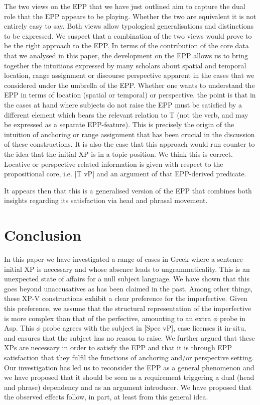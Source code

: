 \documentclass[11pt]{article}
\begin{document}
The two views on the EPP that we have just outlined aim to capture the dual role that the EPP appears to be playing.  Whether the two are equivalent it is not entirely easy to say.  Both views allow typological generalisations and distinctions to be expressed.  We suspect that a combination of the two views would prove to be the right approach to the EPP.  In terms of the contribution of the core data that we analysed in this paper, the development on the EPP allows us to bring together the intuitions expressed by many scholars about spatial and temporal location, range assignment or discourse perspective apparent in the cases that we considered under the umbrella of the EPP.  Whether one wants to understand the EPP in terms of location (spatial or temporal) or perspective, the point is that in the cases at hand where subjects do not raise the EPP must be satisfied by a different element which bears the relevant relation to T (not the verb, and may be expressed as a separate EPP-feature).  This is precisely the origin of the intuition of anchoring or range assignment that has been crucial in the discussion of these constructions. It is also the case that this approach would run counter to the idea that the initial XP is in a topic position.  We think this is correct.  Locative or perspective related information is given with respect to the propositional core, i.e. [T vP] and an argument of that EPP-derived predicate.

It appears then that this is a generalised version of the EPP that combines both insights regarding its satisfaction via head and phrasal movement.


 
 \section{Conclusion} \label{concl}
In this paper we have investigated a range of cases in Greek where a sentence initial XP is necessary and whose absence leads to ungrammaticality.  This is an unexpected state of affairs for a null subject language.  We have shown that this goes beyond unaccusatives as has been claimed in the past.  Among other things, these XP-V constructions exhibit a clear preference for the imperfective. Given this preference, we assume that the structural representation of the imperfective is more complex than that of the perfective, amounting  to an extra $\phi$ probe in Asp. This $\phi$ probe agrees with the subject in [Spec vP], case licenses it in-situ, and ensures that the subject has no reason to raise. 
We further argued that these XPs are necessary in order to satisfy the EPP and that it is through EPP satisfaction that they fulfil the functions of anchoring and/or perspective setting.   Our investigation has led us to reconsider the EPP as a general phenomenon and we have proposed that it should be seen as a requirement triggering a dual (head and phrase) dependency and as an argument introducer.  We have proposed that the observed effects follow, in part, at least from this general idea.











\end{document}
